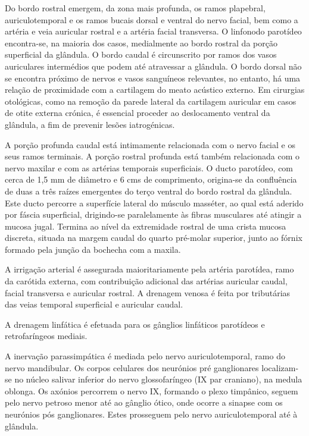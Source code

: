 Do bordo rostral emergem, da zona mais profunda, os ramos plapebral, auriculotemporal e os ramos bucais dorsal e ventral do nervo facial, bem como a artéria e veia auricular rostral e a artéria facial transversa.\cite{dyce} O linfonodo parotídeo encontra-se, na maioria dos casos, medialmente ao bordo rostral da porção superficial da glândula.\cite{dyce} O bordo caudal é circunscrito por ramos dos vasos auriculares intermédios que podem até atravessar a glândula.\cite{dyce}
O bordo dorsal não se encontra próximo de nervos e vasos sanguíneos relevantes, no entanto, há uma relação de proximidade com a cartilagem do meato acústico externo.\cite{dyce} Em cirurgias otológicas, como na remoção da parede lateral da cartilagem auricular em casos de otite externa crónica, é essencial proceder ao deslocamento ventral da glândula, a fim de prevenir lesões iatrogénicas. \cite{dyce}


A porção profunda caudal está intimamente relacionada com o nervo facial e os seus ramos terminais.\cite{dyce} A porção rostral profunda está também relacionada com o nervo maxilar e com as artérias temporais superficiais.\cite{dyce}
O ducto parotídeo, com cerca de 1,5 mm  de diâmetro e 6 cms de comprimento, origina-se da confluência de duas a três raízes emergentes do terço ventral do bordo rostral da glândula.\cite{dyce} Este ducto percorre a superfície lateral do músculo masséter, ao qual está aderido por fáscia superficial, drigindo-se paralelamente às fibras musculares até atingir a mucosa jugal.\cite{dyce} Termina ao nível da extremidade rostral de uma crista mucosa discreta, situada na margem caudal do quarto pré-molar superior, junto ao fórnix formado pela junção da bochecha com a maxila.\cite{dyce}


A irrigação arterial é assegurada maioritariamente pela artéria parotídea, ramo da carótida externa, com contribuição adicional das artérias auricular caudal, facial transversa e auricular rostral.\cite{dyce} A drenagem venosa é feita por tributárias das veias temporal superficial e auricular caudal.\cite{dyce}


A drenagem linfática é efetuada para os gânglios linfáticos parotídeos e retrofaríngeos mediais.\cite{dyce}


A inervação parassimpática é mediada pelo nervo auriculotemporal, ramo do nervo mandibular.\cite{dyce} Os corpos celulares dos neurónios pré ganglionares localizam-se no núcleo salivar inferior do nervo glossofaríngeo (IX par craniano), na medula oblonga.\cite{dyce} Os axónios percorrem o nervo IX, formando o plexo timpânico, seguem pelo nervo petroso menor até ao gânglio ótico, onde ocorre a sinapse com os neurónios pós ganglionares. Estes prosseguem pelo nervo auriculotemporal até à glândula.\cite{dyce}


